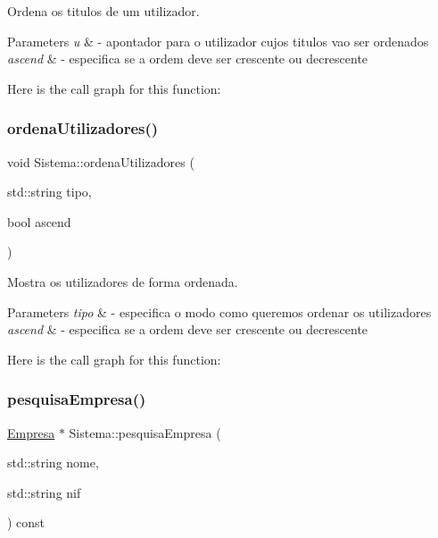Ordena os titulos de um utilizador. 


\begin{DoxyParams}{Parameters}
{\em u} & -\/ apontador para o utilizador cujos titulos vao ser ordenados \\
\hline
{\em ascend} & -\/ especifica se a ordem deve ser crescente ou decrescente \\
\hline
\end{DoxyParams}
Here is the call graph for this function\+:
\mbox{\label{class_sistema_ac3b36e6798c903dd0efd102d7a5dd081}} 
\subsubsection{\texorpdfstring{ordena\+Utilizadores()}{ordenaUtilizadores()}}
{\footnotesize\ttfamily void Sistema\+::ordena\+Utilizadores (\begin{DoxyParamCaption}\item[{std\+::string}]{tipo,  }\item[{bool}]{ascend }\end{DoxyParamCaption})}



Mostra os utilizadores de forma ordenada. 


\begin{DoxyParams}{Parameters}
{\em tipo} & -\/ especifica o modo como queremos ordenar os utilizadores \\
\hline
{\em ascend} & -\/ especifica se a ordem deve ser crescente ou decrescente \\
\hline
\end{DoxyParams}
Here is the call graph for this function\+:
\mbox{\label{class_sistema_a1f22677c42afd48be088f2eca428dede}} 
\subsubsection{\texorpdfstring{pesquisa\+Empresa()}{pesquisaEmpresa()}}
{\footnotesize\ttfamily \mbox{\hyperlink{class_empresa}{Empresa}} $\ast$ Sistema\+::pesquisa\+Empresa (\begin{DoxyParamCaption}\item[{std\+::string}]{nome,  }\item[{std\+::string}]{nif }\end{DoxyParamCaption}) const}



